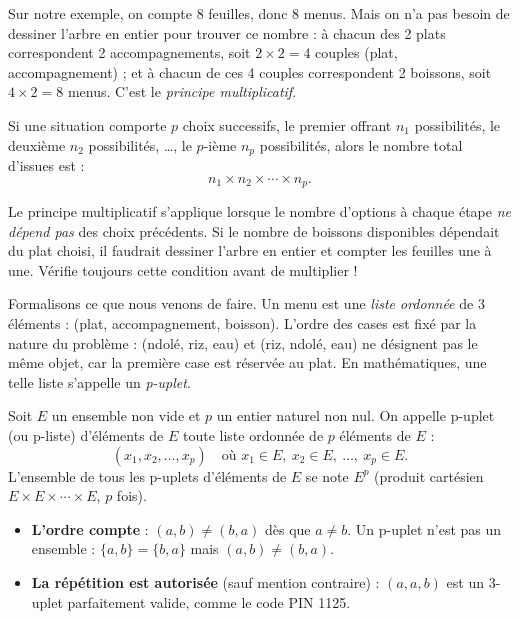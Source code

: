 \documentclass[11pt]{article}
\newcommand{\cle}[1]{{\popxbold\color{popdark}#1}}
\newcounter{popsec}
\newcounter{popsub}
\newcommand{\courssub}[1]{%
  \stepcounter{popsub}%
  \par\vspace{9pt}\noindent{\popxbold\fontsize{11.5}{13}\selectfont\color{popink}{\color{poporange}\thepopsec.\thepopsub}\hspace{6pt}#1}\par\nopagebreak\vspace{4pt}
}
\begin{document}
Sur notre exemple, on compte 8 feuilles, donc 8 menus. Mais on n'a pas besoin de dessiner l'arbre en entier pour trouver ce nombre : à chacun des 2 plats correspondent 2 accompagnements, soit $2 \times 2 = 4$ couples (plat, accompagnement) ; et à chacun de ces 4 couples correspondent 2 boissons, soit $4 \times 2 = 8$ menus. C'est le \emph{principe multiplicatif}.

\begin{propriete}
Si une situation comporte $p$ choix successifs, le premier offrant $n_1$ possibilités, le deuxième $n_2$ possibilités, \dots, le $p$-ième $n_p$ possibilités, alors le nombre total d'issues est :
\[ n_1 \times n_2 \times \cdots \times n_p. \]
\end{propriete}

\begin{attention}
Le principe multiplicatif s'applique lorsque le nombre d'options à chaque étape \emph{ne dépend pas} des choix précédents. Si le nombre de boissons disponibles dépendait du plat choisi, il faudrait dessiner l'arbre en entier et compter les feuilles une à une. Vérifie toujours cette condition avant de multiplier !
\end{attention}

\courssub{Les p-uplets (ou p-listes)}

Formalisons ce que nous venons de faire. Un menu est une \emph{liste ordonnée} de 3 éléments : (plat, accompagnement, boisson). L'ordre des cases est fixé par la nature du problème : (ndolé, riz, eau) et (riz, ndolé, eau) ne désignent pas le même objet, car la première case est réservée au plat. En mathématiques, une telle liste s'appelle un \emph{p-uplet}.

\begin{definition}
Soit $E$ un ensemble non vide et $p$ un entier naturel non nul. On appelle \cle{p-uplet} (ou \cle{p-liste}) d'éléments de $E$ toute liste ordonnée de $p$ éléments de $E$ :
\[ (x_1, x_2, \ldots, x_p) \quad \text{où } x_1 \in E,\ x_2 \in E,\ \ldots,\ x_p \in E. \]
L'ensemble de tous les p-uplets d'éléments de $E$ se note $E^p$ (produit cartésien $E \times E \times \cdots \times E$, $p$ fois).
\end{definition}

\begin{aretenir}
\begin{itemize}
\item \textbf{L'ordre compte} : $(a, b) \neq (b, a)$ dès que $a \neq b$. Un p-uplet n'est pas un ensemble : $\{a, b\} = \{b, a\}$ mais $(a,b) \neq (b,a)$.
\item \textbf{La répétition est autorisée} (sauf mention contraire) : $(a, a, b)$ est un 3-uplet parfaitement valide, comme le code PIN 1125.
\end{itemize}
\end{aretenir}
\end{document}
